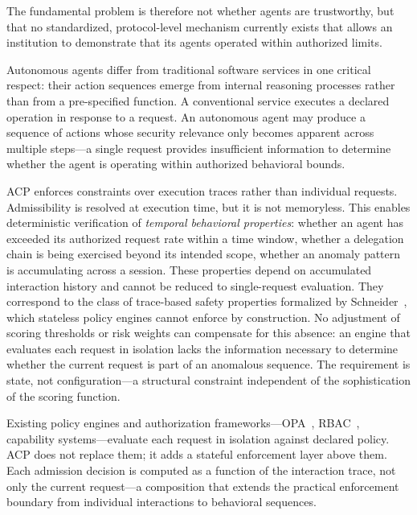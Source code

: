 \documentclass[11pt]{article}
\theoremstyle{definition}
\begin{document}
The fundamental problem is therefore not whether agents are trustworthy, but that no standardized, protocol-level mechanism currently exists that allows an institution to demonstrate that its agents operated within authorized limits.

Autonomous agents differ from traditional software services in one critical respect:
their action sequences emerge from internal reasoning processes rather than from a pre-specified
function.
A conventional service executes a declared operation in response to a request.
An autonomous agent may produce a sequence of actions whose security relevance only becomes
apparent across multiple steps---a single request provides insufficient information to determine
whether the agent is operating within authorized behavioral bounds.

ACP enforces constraints over execution traces rather than individual requests.
Admissibility is resolved at execution time, but it is not memoryless.
This enables deterministic verification of \emph{temporal behavioral properties}: whether an agent
has exceeded its authorized request rate within a time window, whether a delegation chain is being
exercised beyond its intended scope, whether an anomaly pattern is accumulating across a session.
These properties depend on accumulated interaction history and cannot be reduced to single-request
evaluation.
They correspond to the class of trace-based safety properties formalized by
Schneider~\cite{schneider2000enforceable}, which stateless policy engines cannot enforce by
construction.
No adjustment of scoring thresholds or risk weights can compensate for this absence:
an engine that evaluates each request in isolation lacks the information necessary to determine
whether the current request is part of an anomalous sequence.
The requirement is state, not configuration---a structural constraint independent of the
sophistication of the scoring function.

Existing policy engines and authorization frameworks---OPA~\cite{opa}, RBAC~\cite{sandhu1996rbac},
capability systems---evaluate each request in isolation against declared policy.
ACP does not replace them; it adds a stateful enforcement layer above them.
Each admission decision is computed as a function of the interaction trace, not only the current
request---a composition that extends the practical enforcement boundary from individual interactions
to behavioral sequences.
\end{document}
